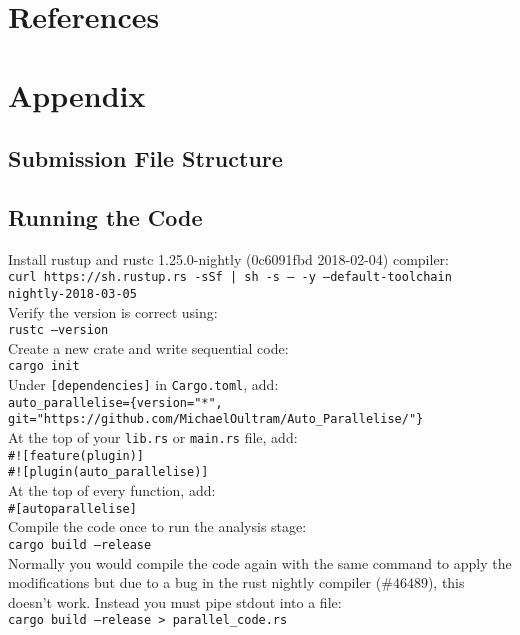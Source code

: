 \chapter{References}
\printbibliography[heading=none]

\chapter{Appendix}
\section{Submission File Structure}

\section{Running the Code}
\label{sec:running-the-code}
Install rustup and rustc 1.25.0-nightly (0c6091fbd 2018-02-04) compiler: \\
\texttt{curl https://sh.rustup.rs -sSf | sh -s -- -y --default-toolchain nightly-2018-03-05} \\

Verify the version is correct using: \\
\texttt{rustc --version} \\

Create a new crate and write sequential code: \\
\texttt{cargo init} \\

Under \texttt{[dependencies]} in \texttt{Cargo.toml}, add: \\
\texttt{auto\_parallelise=\{version="*", git="https://github.com/MichaelOultram/Auto\_Parallelise/"\}} \\

At the top of your \texttt{lib.rs} or \texttt{main.rs} file, add: \\
\texttt{\#![feature(plugin)]} \\
\texttt{\#![plugin(auto\_parallelise)]} \\

At the top of every function, add: \\
\texttt{\#[autoparallelise]} \\

Compile the code once to run the analysis stage: \\
\texttt{cargo build --release} \\

Normally you would compile the code again with the same command to apply the modifications but due to a bug in the rust nightly compiler (\href{https://github.com/rust-lang/rust/issues/46489}{$\#46489$}), this doesn't work. Instead you must pipe stdout into a file: \\
\texttt{cargo build --release > parallel\_code.rs} \\

